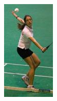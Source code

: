 \begin{figure}[h]
\begin{subfigure}[b]{.15\textwidth}
\end{subfigure}
\begin{subfigure}[b]{.15\textwidth}
	\centering
  \includegraphics[height=4\textwidth / 3]{./images/LSP5}

\end{subfigure}
\end{figure}
